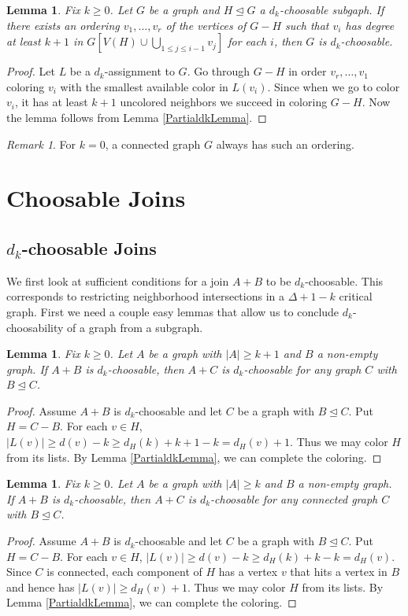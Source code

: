 \documentclass[12pt]{article}
\theoremstyle{plain}
\newtheorem{lem}[thm]{Lemma}
\theoremstyle{definition}
\theoremstyle{remark}
\newtheorem*{remark}{Remark}
\begin{document}
\begin{lem}\label{ColorableSubgraphdk}
Fix $k \geq 0$. Let $G$ be a graph and $H \unlhd G$ a $d_k$-choosable subgaph.  If there exists an ordering $v_1, \ldots, v_r$ of the vertices of $G - H$
such that $v_i$ has degree at least $k+1$ in $G[V(H) \cup \bigcup_{1 \leq j \leq i - 1} v_j]$ for each $i$, then $G$ is $d_k$-choosable.
\end{lem}
\begin{proof}
Let $L$ be a $d_k$-assignment to $G$. Go through $G-H$ in order $v_r, \ldots, v_1$ coloring $v_i$ with the smallest available color in $L(v_i)$.  Since when we go to color $v_i$, it has at least $k+1$ uncolored neighbors we succeed in coloring $G-H$.  Now the lemma follows from Lemma \ref{PartialdkLemma}.
\end{proof}

\begin{remark}
For $k=0$, a connected graph $G$ always has such an ordering.
\end{remark}

\section{Choosable Joins}
\subsection{$d_k$-choosable Joins}
We first look at sufficient conditions for a join $A+B$ to be $d_k$-choosable.  This corresponds to restricting neighborhood intersections in a $\Delta + 1 - k$ critical graph.  First we need a couple easy lemmas that allow us to conclude $d_k$-choosability of a graph from a subgraph.

\begin{lem}\label{ArbitrarySubgraphLemma}
Fix $k \geq 0$. Let $A$ be a graph with $|A| \geq k + 1$ and $B$ a non-empty graph.  If $A+B$ is $d_k$-choosable, then $A+C$ is 
$d_k$-choosable for any graph $C$ with $B \unlhd C$.
\end{lem}
\begin{proof}
 Assume $A+B$ is $d_k$-choosable and let $C$ be a graph with $B \unlhd C$.  Put $H = C - B$.  For each $v \in H$, 
$|L(v)| \geq d(v) - k \geq d_H(k) + k+ 1 - k = d_H(v) + 1$.  Thus we may color $H$ from its lists.  By 
Lemma \ref{PartialdkLemma}, we can complete the coloring.
\end{proof}

\begin{lem}\label{ConnectedSubgraphLemma}
Fix $k \geq 0$. Let $A$ be a graph with $|A| \geq k$ and $B$ a non-empty graph.  If $A+B$ is $d_k$-choosable, then $A+C$ is 
$d_k$-choosable for any connected graph $C$ with $B \unlhd C$.
\end{lem}
\begin{proof}
Assume $A+B$ is $d_k$-choosable and let $C$ be a graph with $B \unlhd C$.  Put $H = C - B$.  For each $v \in H$, 
$|L(v)| \geq d(v) - k \geq d_H(k) + k - k = d_H(v)$.  Since $C$ is connected, each component of $H$ has a vertex $v$
that hits a vertex in $B$ and hence has $|L(v)| \geq d_H(v) + 1$. Thus we may color $H$ from its lists.  By 
Lemma \ref{PartialdkLemma}, we can complete the coloring.
\end{proof}
\end{document}
